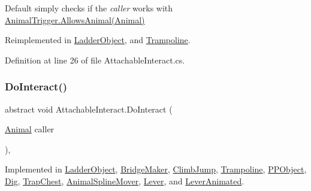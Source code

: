 Default simply checks if the {\itshape caller}  works with \mbox{\hyperlink{class_animal_trigger_ae8394dfcf5f91b8c413959a4d6baa3a9}{Animal\+Trigger.\+Allows\+Animal(\+Animal)}} 



Reimplemented in \mbox{\hyperlink{class_ladder_object_aa18c443d78ab35fa3aba0d6ce7328539}{Ladder\+Object}}, and \mbox{\hyperlink{class_trampoline_a7cd4dba8195da3407019ef918daa1280}{Trampoline}}.



Definition at line 26 of file Attachable\+Interact.\+cs.

\mbox{\label{class_attachable_interact_a9b07a54f1dbb96777c4bd287dfe438e3}} 
\subsubsection{\texorpdfstring{Do\+Interact()}{DoInteract()}}
{\footnotesize\ttfamily abstract void Attachable\+Interact.\+Do\+Interact (\begin{DoxyParamCaption}\item[{\mbox{\hyperlink{class_animal}{Animal}}}]{caller }\end{DoxyParamCaption})\hspace{0.3cm}{\ttfamily [protected]}, {}}



Implemented in \mbox{\hyperlink{class_ladder_object_ad7c09ffac9842f0a4ffb799f5caa78cf}{Ladder\+Object}}, \mbox{\hyperlink{class_bridge_maker_a667e3fa3514b0256b73ce3149dabaf90}{Bridge\+Maker}}, \mbox{\hyperlink{class_climb_jump_a65ed10c05b80b5b2fe2df7112546f2fc}{Climb\+Jump}}, \mbox{\hyperlink{class_trampoline_a37c1ae11b89a61be854133cfa1628572}{Trampoline}}, \mbox{\hyperlink{class_p_p_object_a3359bdf648e8252f0d7326c65bbf9d73}{P\+P\+Object}}, \mbox{\hyperlink{class_dig_a1b5c5ca71b632a658f9f1a0bd5e40658}{Dig}}, \mbox{\hyperlink{class_trap_chest_afe04e422ad7c45f5de0509504412c3dc}{Trap\+Chest}}, \mbox{\hyperlink{class_animal_spline_mover_aa8555455eae08f3834a1cafb97a21c36}{Animal\+Spline\+Mover}}, \mbox{\hyperlink{class_lever_a0a1c141e11547a71e93492bebbd045d7}{Lever}}, and \mbox{\hyperlink{class_lever_animated_a63d3742fe2e3b7597c7eecbc57ae7a0e}{Lever\+Animated}}.

\mbox{\label{class_attachable_interact_abeaa046ec8352957e008cde245fd4f65}} 
